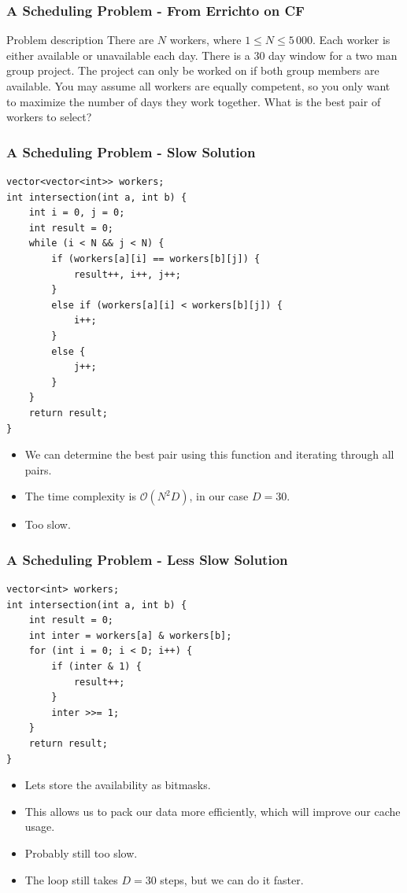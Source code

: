 \documentclass{beamer}
\begin{document}
\begin{frame}[plain]
	\frametitle{A Scheduling Problem - From Errichto on CF}
	\begin{block}{Problem description}
        There are $N$ workers, where $1 \leq N \leq 5\,000$.
        Each worker is either available or unavailable each day.
        There is a $30$ day window for a two man group project.
        The project can only be worked on if both group members are available.
        You may assume all workers are equally competent, so you only want to maximize the number of days they work together.
        What is the best pair of workers to select?
    \end{block}
\end{frame}

\begin{frame}
	\frametitle{A Scheduling Problem - Slow Solution}
    \begin{verbatim}
vector<vector<int>> workers;
int intersection(int a, int b) {
    int i = 0, j = 0;
    int result = 0;
    while (i < N && j < N) {
        if (workers[a][i] == workers[b][j]) {
            result++, i++, j++;
        }
        else if (workers[a][i] < workers[b][j]) {
            i++;
        }
        else {
            j++;
        }
    }
    return result;
}
    \end{verbatim}
    \begin{itemize}
        \item<2-> We can determine the best pair using this function and iterating through all pairs.
        \item<3-> The time complexity is $\mathcal{O}(N^2D)$, in our case $D=30$.
        \item<4-> Too slow.
    \end{itemize}
\end{frame}

\begin{frame}
	\frametitle{A Scheduling Problem - Less Slow Solution}
    \begin{verbatim}
vector<int> workers;
int intersection(int a, int b) {
    int result = 0;
    int inter = workers[a] & workers[b];
    for (int i = 0; i < D; i++) {
        if (inter & 1) {
            result++;
        }
        inter >>= 1;
    }
    return result;
}
    \end{verbatim}
    \begin{itemize}
        \item Lets store the availability as bitmasks.
        \item<2-> This allows us to pack our data more efficiently, which will improve our cache usage.
        \item<3-> Probably still too slow.
        \item<4-> The loop still takes $D = 30$ steps, but we can do it faster.
    \end{itemize}
\end{frame}
\end{document}
